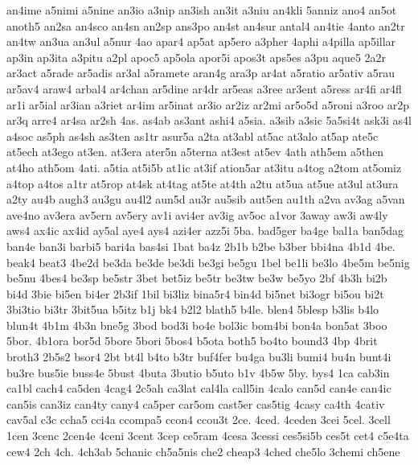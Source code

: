 {an4ime 
a5nimi 
a5nine 
an3io 
a3nip 
an3ish 
an3it 
a3niu 
an4kli 
5anniz 
ano4 
an5ot 
anoth5 
an2sa 
an4sco 
an4sn 
an2sp 
ans3po 
an4st 
an4sur 
antal4 
an4tie 
4anto 
an2tr 
an4tw 
an3ua 
an3ul 
a5nur 
4ao 
apar4 
ap5at 
ap5ero 
a3pher 
4aphi 
a4pilla 
ap5illar 
ap3in 
ap3ita 
a3pitu 
a2pl 
apoc5 
ap5ola 
apor5i 
apos3t 
aps5es 
a3pu 
aque5 
2a2r 
ar3act 
a5rade 
ar5adis 
ar3al 
a5ramete 
aran4g 
ara3p 
ar4at 
a5ratio 
ar5ativ 
a5rau 
ar5av4 
araw4 
arbal4 
ar4chan 
ar5dine 
ar4dr 
ar5eas 
a3ree 
ar3ent 
a5ress 
ar4fi 
ar4fl 
ar1i 
ar5ial 
ar3ian 
a3riet 
ar4im 
ar5inat 
ar3io 
ar2iz 
ar2mi 
ar5o5d 
a5roni 
a3roo 
ar2p 
ar3q 
arre4 
ar4sa 
ar2sh 
4as. 
as4ab 
as3ant 
ashi4 
a5sia. 
a3sib 
a3sic 
5a5si4t 
ask3i 
as4l 
a4soc 
as5ph 
as4sh 
as3ten 
as1tr 
asur5a 
a2ta 
at3abl 
at5ac 
at3alo 
at5ap 
ate5c 
at5ech 
at3ego 
at3en. 
at3era 
ater5n 
a5terna 
at3est 
at5ev 
4ath 
ath5em 
a5then 
at4ho 
ath5om 
4ati. 
a5tia 
at5i5b 
at1ic 
at3if 
ation5ar 
at3itu 
a4tog 
a2tom 
at5omiz 
a4top 
a4tos 
a1tr 
at5rop 
at4sk 
at4tag 
at5te 
at4th 
a2tu 
at5ua 
at5ue 
at3ul 
at3ura 
a2ty 
au4b 
augh3 
au3gu 
au4l2 
aun5d 
au3r 
au5sib 
aut5en 
au1th 
a2va 
av3ag 
a5van 
ave4no 
av3era 
av5ern 
av5ery 
av1i 
avi4er 
av3ig 
av5oc 
a1vor 
3away 
aw3i 
aw4ly 
aws4 
ax4ic 
ax4id 
ay5al 
aye4 
ays4 
azi4er 
azz5i 
5ba. 
bad5ger 
ba4ge 
bal1a 
ban5dag 
ban4e 
ban3i 
barbi5 
bari4a 
bas4si 
1bat 
ba4z 
2b1b 
b2be 
b3ber 
bbi4na 
4b1d 
4be. 
beak4 
beat3 
4be2d 
be3da 
be3de 
be3di 
be3gi 
be5gu 
1bel 
be1li 
be3lo 
4be5m 
be5nig 
be5nu 
4bes4 
be3sp 
be5str 
3bet 
bet5iz 
be5tr 
be3tw 
be3w 
be5yo 
2bf 
4b3h 
bi2b 
bi4d 
3bie 
bi5en 
bi4er 
2b3if 
1bil 
bi3liz 
bina5r4 
bin4d 
bi5net 
bi3ogr 
bi5ou 
bi2t 
3bi3tio 
bi3tr 
3bit5ua 
b5itz 
b1j 
bk4 
b2l2 
blath5 
b4le. 
blen4 
5blesp 
b3lis 
b4lo 
blun4t 
4b1m 
4b3n 
bne5g 
3bod 
bod3i 
bo4e 
bol3ic 
bom4bi 
bon4a 
bon5at 
3boo 
5bor. 
4b1ora 
bor5d 
5bore 
5bori 
5bos4 
b5ota 
both5 
bo4to 
bound3 
4bp 
4brit 
broth3 
2b5s2 
bsor4 
2bt 
bt4l 
b4to 
b3tr 
buf4fer 
bu4ga 
bu3li 
bumi4 
bu4n 
bunt4i 
bu3re 
bus5ie 
buss4e 
5bust 
4buta 
3butio 
b5uto 
b1v 
4b5w 
5by. 
bys4 
1ca 
cab3in 
ca1bl 
cach4 
ca5den 
4cag4 
2c5ah 
ca3lat 
cal4la 
call5in 
4calo 
can5d 
can4e 
can4ic 
can5is 
can3iz 
can4ty 
cany4 
ca5per 
car5om 
cast5er 
cas5tig 
4casy 
ca4th 
4cativ 
cav5al 
c3c 
ccha5 
cci4a 
ccompa5 
ccon4 
ccou3t 
2ce. 
4ced. 
4ceden 
3cei 
5cel. 
3cell 
1cen 
3cenc 
2cen4e 
4ceni 
3cent 
3cep 
ce5ram 
4cesa 
3cessi 
ces5si5b 
ces5t 
cet4 
c5e4ta 
cew4 
2ch 
4ch. 
4ch3ab 
5chanic 
ch5a5nis 
che2 
cheap3 
4ched 
che5lo 
3chemi 
ch5ene 
}
